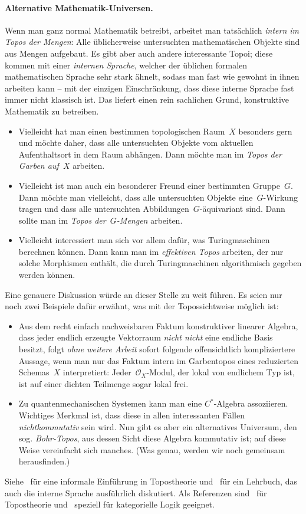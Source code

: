 \documentclass[a4paper,ngerman,12pt]{scrartcl}
\theoremstyle{definition}
\theoremstyle{plain}
\theoremstyle{remark}
\renewcommand{\O}{\mathcal{O}}
\renewcommand{\_}{\mathpunct{.}\,}
\newcommand{\?}{\,{:}\,}
\begin{document}
\paragraph{Alternative Mathematik-Universen.} Wenn man ganz normal Mathematik
betreibt, arbeitet man tatsächlich \emph{intern im Topos der Mengen}: Alle
üblicherweise untersuchten mathematischen Objekte sind aus Mengen aufgebaut. Es gibt
aber auch andere interessante Topoi; diese kommen mit einer \emph{internen
Sprache}, welcher der üblichen formalen mathematischen Sprache sehr stark
ähnelt, sodass man fast wie gewohnt in ihnen arbeiten kann -- mit der einzigen
Einschränkung, dass diese interne Sprache fast immer nicht klassisch ist. Das
liefert einen rein sachlichen Grund, konstruktive Mathematik zu betreiben.
\begin{itemize}
\item Vielleicht hat man einen bestimmen topologischen Raum~$X$ besonders gern
und möchte daher, dass alle untersuchten Objekte vom aktuellen Aufenthaltsort
in dem Raum abhängen. Dann möchte man im \emph{Topos der Garben auf~$X$}
arbeiten.
\item Vielleicht ist man auch ein besonderer Freund einer bestimmten
Gruppe~$G$. Dann möchte man vielleicht, dass alle untersuchten Objekte
eine~$G$-Wirkung tragen und dass alle untersuchten Abbildungen~$G$-äquivariant
sind. Dann sollte man im \emph{Topos der~$G$-Mengen} arbeiten.
\item Vielleicht interessiert man sich vor allem dafür, was Turingmaschinen
berechnen können. Dann kann man im \emph{effektiven Topos} arbeiten, der nur
solche Morphismen enthält, die durch Turingmaschinen algorithmisch gegeben
werden können.
\end{itemize}
Eine genauere Diskussion würde an dieser Stelle zu weit
führen. Es seien nur noch zwei Beispiele dafür erwähnt, was mit der Topossichtweise
möglich ist:
\begin{itemize}
\item Aus dem recht einfach nachweisbaren Faktum konstruktiver linearer
Algebra, dass jeder endlich erzeugte Vektorraum \emph{nicht nicht} eine endliche
Basis besitzt, folgt \emph{ohne weitere Arbeit} sofort folgende offensichtlich
kompliziertere Aussage, wenn man nur das Faktum intern im Garbentopos eines reduzierten
Schemas~$X$ interpretiert: Jeder~$\O_X$-Modul, der lokal von endlichem Typ ist,
ist auf einer dichten Teilmenge sogar lokal frei.
\item Zu quantenmechanischen Systemen kann man eine $C^*$-Algebra assoziieren.
Wichtiges Merkmal ist, dass diese in allen interessanten Fällen
\emph{nichtkommutativ} sein wird. Nun gibt es aber ein alternatives Universum,
den sog. \emph{Bohr-Topos}, aus dessen Sicht diese Algebra kommutativ ist; auf
diese Weise vereinfacht sich manches. (Was genau, werden wir noch gemeinsam
herausfinden.)
\end{itemize}
Siehe~\cite{leinster:topos} für eine informale Einführung in Topostheorie
und~\cite{moerdijk:maclane:sheaves} für ein Lehrbuch, das auch die interne
Sprache ausführlich diskutiert. Als Referenzen sind~\cite{johnstone:elephant}
für Topostheorie und~\cite{lambek:scott:hocatlogic} speziell für kategorielle
Logik geeignet.
\end{document}
